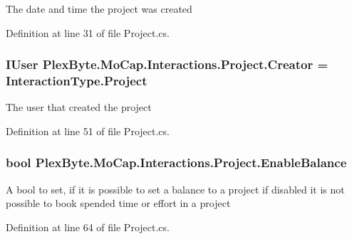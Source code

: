 The date and time the project was created 



Definition at line 31 of file Project.\+cs.

\subsubsection[{\texorpdfstring{Creator}{Creator}}]{\setlength{\rightskip}{0pt plus 5cm}I\+User Plex\+Byte.\+Mo\+Cap.\+Interactions.\+Project.\+Creator = {\bf Interaction\+Type.\+Project}\hspace{0.3cm}{\ttfamily [get]}}\hypertarget{class_plex_byte_1_1_mo_cap_1_1_interactions_1_1_project_aa121bc39de6d60290903f188a3734557}{}\label{class_plex_byte_1_1_mo_cap_1_1_interactions_1_1_project_aa121bc39de6d60290903f188a3734557}


The user that created the project 



Definition at line 51 of file Project.\+cs.

\subsubsection[{\texorpdfstring{Enable\+Balance}{EnableBalance}}]{\setlength{\rightskip}{0pt plus 5cm}bool Plex\+Byte.\+Mo\+Cap.\+Interactions.\+Project.\+Enable\+Balance\hspace{0.3cm}{\ttfamily [get]}}\hypertarget{class_plex_byte_1_1_mo_cap_1_1_interactions_1_1_project_a416293f2e592d5d42afecdd3a4f99737}{}\label{class_plex_byte_1_1_mo_cap_1_1_interactions_1_1_project_a416293f2e592d5d42afecdd3a4f99737}


A bool to set, if it is possible to set a balance to a project if disabled it is not possible to book spended time or effort in a project 



Definition at line 64 of file Project.\+cs.

